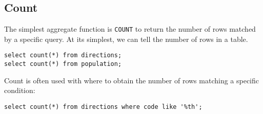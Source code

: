 \subsection{Count}\label{count}

The simplest aggregate function is \texttt{COUNT} to return the number
of rows matched by a specific query. At its simplest, we can tell the
number of rows in a table.

\begin{verbatim}
select count(*) from directions;
select count(*) from population; 
\end{verbatim}

Count is often used with where to obtain the number of rows matching a
specific condition:

\begin{verbatim}
select count(*) from directions where code like '%th'; 
\end{verbatim}



